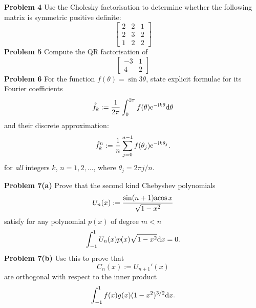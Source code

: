 \documentclass[12pt,a4paper]{article}
\def\acos{ {\rm acos}\, }
\begin{document}
\textbf{Problem 4} Use the Cholesky factorisation to determine whether the following matrix is symmetric positive definite:
\[
\begin{bmatrix} 2 & 2 & 1  \\
2 & 3 & 2\\
1 & 2 & 2
\end{bmatrix}
\]
\textbf{Problem 5} Compute the QR factorisation of
\[
\begin{bmatrix}
-3 & 1 \\
4 & 2
\end{bmatrix}
\]
\textbf{Problem 6} For the function $f(\ensuremath{\theta}) = \sin 3 \ensuremath{\theta}$, state explicit formulae for its Fourier coefficients
\[
\hat f_k := {1 \over 2\ensuremath{\pi}} \int_0^{2\ensuremath{\pi}} f(\ensuremath{\theta}) {\rm e}^{-{\rm i} k \ensuremath{\theta}} {\rm d}\ensuremath{\theta}
\]
and  their discrete approximation:
\[
\hat f_k^n := {1 \over n} \sum_{j=0}^{n-1} f(\ensuremath{\theta}_j) {\rm e}^{-{\rm i} k \ensuremath{\theta}_j}.
\]
for \emph{all} integers $k$, $n = 1,2,\ensuremath{\ldots}$, where $\ensuremath{\theta}_j = 2\ensuremath{\pi} j/n$.

\textbf{Problem 7(a)} Prove that the second kind Chebyshev polynomials
\[
U_n(x) := {\sin (n+1) \acos x \over \sqrt{1-x^2}}
\]
satisfy for any polynomial $p(x)$ of degree $m < n$
\[
\int_{-1}^1 U_n(x) p(x) \sqrt{1-x^2} {\rm d}x = 0.
\]
\textbf{Problem 7(b)} Use this to prove that
\[
C_n(x) := U_{n+1}'(x)
\]
are orthogonal with respect to the inner product
\[
\ensuremath{\int}_{-1}^1 f(x)g(x) (1-x^2)^{3/2} {\rm d}x.
\]
\end{document}
